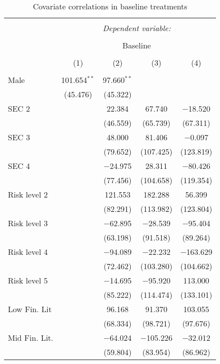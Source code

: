 
\begin{table}[!htbp] \centering 
  \caption{Covariate correlations in baseline treatments} 
  \label{tbl:baseline} 
\begin{tabular}{@{\extracolsep{5pt}}lcccc} 
\\[-1.8ex]\hline 
\hline \\[-1.8ex] 
 & \multicolumn{4}{c}{\textit{Dependent variable:}} \\ 
\cline{2-5} 
\\[-1.8ex] & \multicolumn{4}{c}{Baseline} \\ 
\\[-1.8ex] & (1) & (2) & (3) & (4)\\ 
\hline \\[-1.8ex] 
 Male & 101.654$^{**}$ & 97.660$^{**}$ &  &  \\ 
  & (45.476) & (45.322) &  &  \\ 
  SEC 2 &  & 22.384 & 67.740 & $-$18.520 \\ 
  &  & (46.559) & (65.739) & (67.311) \\ 
  SEC 3 &  & 48.000 & 81.406 & $-$0.097 \\ 
  &  & (79.652) & (107.425) & (123.819) \\ 
  SEC 4 &  & $-$24.975 & 28.311 & $-$80.426 \\ 
  &  & (77.456) & (104.658) & (119.354) \\ 
  Risk level 2 &  & 121.553 & 182.288 & 56.399 \\ 
  &  & (82.291) & (113.982) & (123.804) \\ 
  Risk level 3 &  & $-$62.895 & $-$28.539 & $-$95.404 \\ 
  &  & (63.198) & (91.518) & (89.264) \\ 
  Risk level 4 &  & $-$94.089 & $-$22.232 & $-$163.629 \\ 
  &  & (72.462) & (103.280) & (104.662) \\ 
  Risk level 5 &  & $-$14.695 & $-$95.920 & 113.000 \\ 
  &  & (85.222) & (114.474) & (133.101) \\ 
  Low Fin. Lit &  & 96.168 & 91.370 & 103.055 \\ 
  &  & (68.334) & (98.721) & (97.676) \\ 
  Mid Fin. Lit. &  & $-$64.024 & $-$105.226 & $-$32.012 \\ 
  &  & (59.804) & (83.954) & (86.962) \\ 

\end{tabular}
\end{table}
